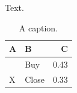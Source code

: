 \documentclass{article}
\begin{document}
Text.
\begin{table}[ht]
\caption{A caption.}
\centering
\begin{tabular}{llr}
\hline
A & B & C \\
\hline
&Buy & 0.43 \\
X &Close & 0.33 \\
\end{tabular}
\end{table}
\end{document}
